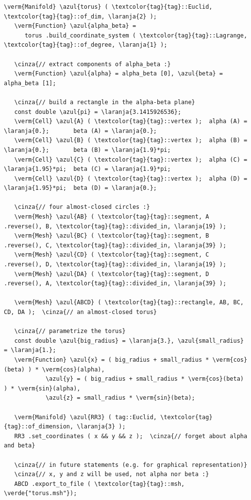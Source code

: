 \begin{Verbatim}[commandchars=\\\{\},formatcom=\small\tt,frame=single,
   label=parag-\ref{\numb section 2.\numb parag 20}.cpp,rulecolor=\color{moldura},
   baselinestretch=0.94,framesep=2mm]
   \verm{Manifold} \azul{torus} ( \textcolor{tag}{tag}::Euclid, \textcolor{tag}{tag}::of_dim, \laranja{2} );
   \verm{Function} \azul{alpha_beta} =
      torus .build_coordinate_system ( \textcolor{tag}{tag}::Lagrange, \textcolor{tag}{tag}::of_degree, \laranja{1} );

   \cinza{// extract components of alpha_beta :}
   \verm{Function} \azul{alpha} = alpha_beta [0], \azul{beta} = alpha_beta [1];

   \cinza{// build a rectangle in the alpha-beta plane}
   const double \azul{pi} = \laranja{3.1415926536};
   \verm{Cell} \azul{A} ( \textcolor{tag}{tag}::vertex );  alpha (A) = \laranja{0.};       beta (A) = \laranja{0.};
   \verm{Cell} \azul{B} ( \textcolor{tag}{tag}::vertex );  alpha (B) = \laranja{0.};       beta (B) = \laranja{1.9}*pi;
   \verm{Cell} \azul{C} ( \textcolor{tag}{tag}::vertex );  alpha (C) = \laranja{1.95}*pi;  beta (C) = \laranja{1.9}*pi;
   \verm{Cell} \azul{D} ( \textcolor{tag}{tag}::vertex );  alpha (D) = \laranja{1.95}*pi;  beta (D) = \laranja{0.};

   \cinza{// four almost-closed circles :}
   \verm{Mesh} \azul{AB} ( \textcolor{tag}{tag}::segment, A .reverse(), B, \textcolor{tag}{tag}::divided_in, \laranja{19} );
   \verm{Mesh} \azul{BC} ( \textcolor{tag}{tag}::segment, B .reverse(), C, \textcolor{tag}{tag}::divided_in, \laranja{39} );
   \verm{Mesh} \azul{CD} ( \textcolor{tag}{tag}::segment, C .reverse(), D, \textcolor{tag}{tag}::divided_in, \laranja{19} );
   \verm{Mesh} \azul{DA} ( \textcolor{tag}{tag}::segment, D .reverse(), A, \textcolor{tag}{tag}::divided_in, \laranja{39} );

   \verm{Mesh} \azul{ABCD} ( \textcolor{tag}{tag}::rectangle, AB, BC, CD, DA );  \cinza{// an almost-closed torus}
   
   \cinza{// parametrize the torus}
   const double \azul{big_radius} = \laranja{3.}, \azul{small_radius} = \laranja{1.};
   \verm{Function} \azul{x} = ( big_radius + small_radius * \verm{cos}(beta) ) * \verm{cos}(alpha),
            \azul{y} = ( big_radius + small_radius * \verm{cos}(beta) ) * \verm{sin}(alpha),
            \azul{z} = small_radius * \verm{sin}(beta);

   \verm{Manifold} \azul{RR3} ( tag::Euclid, \textcolor{tag}{tag}::of_dimension, \laranja{3} );
   RR3 .set_coordinates ( x && y && z );  \cinza{// forget about alpha and beta}

   \cinza{// in future statements (e.g. for graphical representation)}
   \cinza{// x, y and z will be used, not alpha nor beta :}
   ABCD .export_to_file ( \textcolor{tag}{tag}::msh, \verde{"torus.msh"});
\end{Verbatim}

